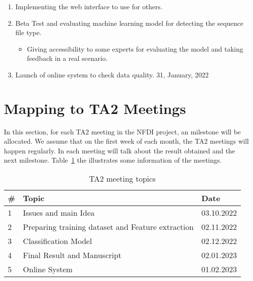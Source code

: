 \documentclass[a4paper]{article}
\newcommand{\deadline}[1]{{\color{blue} \hfill{#1} }}
\begin{document}
\begin{enumerate}
        \item Implementing the web interface to use for others.
        \item Beta Test and evaluating machine learning model for detecting the sequence file type.
        \begin{itemize}
            \item Giving accessibility to some experts for evaluating the model and taking feedback in a real scenario.
        \end{itemize}
        \item Launch of online system to check data quality. \deadline{31, January, 2022}

    \end{enumerate}

    \section{Mapping to TA2 Meetings}\label{sec:ta2}
    In this section, for each TA2 meeting in the NFDI project, an milestone will be allocated.
    We assume that on the first week of each month, the TA2 meetings will happen regularly.
    In each meeting will talk about the result obtained and the next milestone.
    Table~\ref{tab:ta2} the illustrates some information of the meetings.
    \begin{table}[h]\label{tab:ta2}
        \centering
        \caption{TA2 meeting topics}
        \begin{tabular}{lll}
            \# & Topic                                             & Date       \\ \hline
            1  & Issues and main Idea                              & 03.10.2022 \\
            2  & Preparing training dataset and Feature extraction & 02.11.2022 \\
            3  & Classification Model                              & 02.12.2022 \\
            4  & Final Result and Manuscript                       & 02.01.2023 \\
            5  & Online System                                     & 01.02.2023 \\ \hline
        \end{tabular}
    \end{table}

    
    
\end{document}
